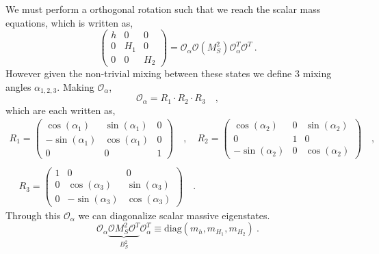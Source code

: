 %
We must perform a orthogonal rotation such that we reach the scalar mass equations, which is written as, 
\begin{equation}
\left( 
\begin{array}{ccc}
h & 0 & 0  \\
0 & H_1 & 0 \\
0 & 0 & H_2 
\end{array} 
\right) = \mathcal{O}_\alpha \mathcal{O} \left(M_S^2\right) \mathcal{O}_\alpha^T \mathcal{O}^T \ .
\end{equation} 
However given the non-trivial mixing between these states we define 3 mixing angles $\alpha_{1,2,3}$. Making $\mathcal{O}_\alpha$, 
\begin{equation}
\mathcal{O}_\alpha = R_1 \cdot R_2 \cdot R_3 \quad , 
\end{equation}
which are each written as,
\begin{gather}
R_1 = \begin{pmatrix}
\cos(\alpha_1) & \sin(\alpha_1) & 0 \\
-\sin(\alpha_1) & \cos(\alpha_1) & 0 \\ 
0 & 0 & 1 
\end{pmatrix} \quad , \quad R_2 = \begin{pmatrix}
\cos(\alpha_2) & 0 & \sin(\alpha_2) \\ 
0 & 1 & 0 \\
-\sin(\alpha_2) & 0 & \cos(\alpha_2) 
\end{pmatrix} \quad ,\\ \\ \quad R_3 = \begin{pmatrix}
1 & 0 & 0 \\
0 & \cos(\alpha_3 ) & \sin(\alpha_3) \\
0 & -\sin(\alpha_3) & \cos(\alpha_3) 
\end{pmatrix} \quad . 
\end{gather}
Through this $\mathcal{O}_\alpha$ we can diagonalize scalar massive eigenstates. 
\begin{equation}
\mathcal{O}_\alpha \underbrace{\mathcal{O} M^2_S \mathcal{O}^T }_{B_S^2} \mathcal{O}_\alpha^T \equiv \text{diag}(m_h,m_{H_1},m_{H_2}) \ . 
\end{equation}
